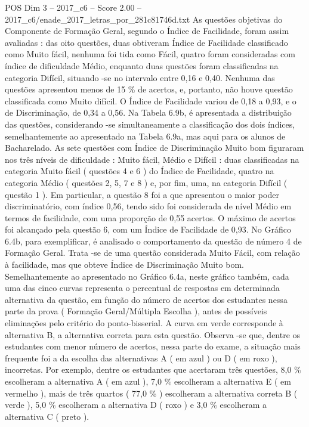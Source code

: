 \begin{textsample}{POS Dim 3 – 2017\_c6 – Score 2.00 – 2017\_c6/enade\_2017\_letras\_por\_281c81746d.txt}
As questões objetivas do Componente de Formação Geral, segundo o Índice de Facilidade, foram assim avaliadas : das oito questões, duas obtiveram Índice de Facilidade classificado como Muito fácil, nenhuma foi tida como Fácil, quatro foram consideradas com índice de dificuldade Médio, enquanto duas questões foram classificadas na categoria Difícil, situando -se no intervalo entre 0,16 e 0,40.
Nenhuma das questões apresentou menos de 15 \% de acertos, e, portanto, não houve questão classificada como Muito difícil.
O Índice de Facilidade variou de 0,18 a 0,93, e o de Discriminação, de 0,34 a 0,56.
Na Tabela 6.9b, é apresentada a distribuição das questões, considerando -se simultaneamente a classificação dos dois índices, semelhantemente ao apresentado na Tabela 6.9a, mas aqui para os alunos de Bacharelado.
As sete questões com Índice de Discriminação Muito bom figuraram nos três níveis de dificuldade : Muito fácil, Médio e Difícil : duas classificadas na categoria Muito fácil ( questões 4 e 6 ) do Índice de Facilidade, quatro na categoria Médio ( questões 2, 5, 7 e 8 ) e, por fim, uma, na categoria Difícil ( questão 1 ).
Em particular, a questão 8 foi a que apresentou o maior poder discriminatório, com índice 0,56, tendo sido foi considerada de nível Médio em termos de facilidade, com uma proporção de 0,55 acertos.
O máximo de acertos foi alcançado pela questão 6, com um Índice de Facilidade de 0,93.
No Gráfico 6.4b, para exemplificar, é analisado o comportamento da questão de número 4 de Formação Geral.
Trata -se de uma questão considerada Muito Fácil, com relação à facilidade, mas que obteve Índice de Discriminação Muito bom.
Semelhantemente ao apresentado no Gráfico 6.4a, neste gráfico também, cada uma das cinco curvas representa o percentual de respostas em determinada alternativa da questão, em função do número de acertos dos estudantes nessa parte da prova ( Formação Geral/Múltipla Escolha ), antes de possíveis eliminações pelo critério do ponto-bisserial.
A curva em verde corresponde à alternativa B, a alternativa correta para esta questão.
Observa -se que, dentre os estudantes com menor número de acertos, nessa parte do exame, a situação mais frequente foi a da escolha das alternativas A ( em azul ) ou D ( em roxo ), incorretas.
Por exemplo, dentre os estudantes que acertaram três questões, 8,0 \% escolheram a alternativa A ( em azul ), 7,0 \% escolheram a alternativa E ( em vermelho ), mais de três quartos ( 77,0 \% ) escolheram a alternativa correta B ( verde ), 5,0 \% escolheram a alternativa D ( roxo ) e 3,0 \% escolheram a alternativa C ( preto ).

\end{textsample}
